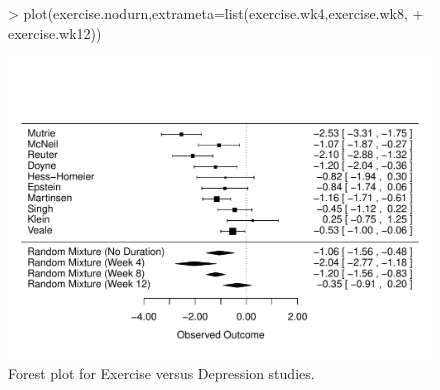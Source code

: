\documentclass{article}
\begin{document}
\begin{figure}
  \centering
\begin{Schunk}
\begin{Sinput}
> plot(exercise.nodurn,extrameta=list(exercise.wk4,exercise.wk8,
+       exercise.wk12))
\end{Sinput}
\end{Schunk}
\includegraphics{metaplus-examples-018}
  \caption{Forest plot for Exercise versus Depression studies.}
  \label{fig:forest3}
\end{figure}


\end{document}
